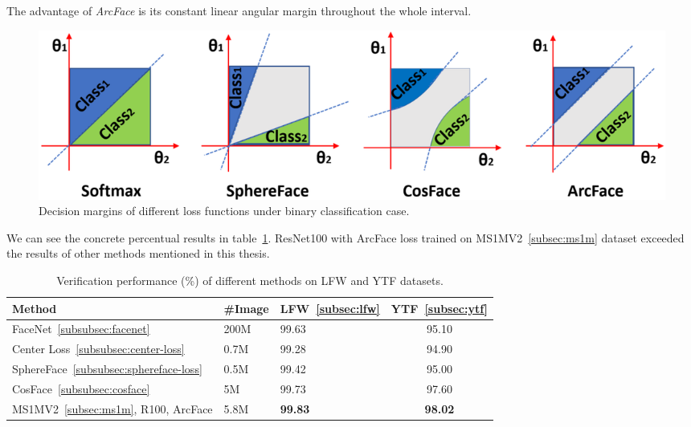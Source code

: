 The advantage of \textit{ArcFace} is its constant linear angular margin throughout the whole interval.

\begin{figure}[H]
    \centering
    \includegraphics[width=\columnwidth]{images/arcface/arcfacecomparison.png}
    \caption{Decision margins of different loss functions under binary classification case.~\cite{ArcFace}}
    \label{fig:arcfacecomp}
\end{figure}

We can see the concrete percentual results in table~\ref{tbl:arcfacecomp}.
ResNet100 with ArcFace loss trained on MS1MV2~\ref{subsec:ms1m} dataset exceeded the results of other methods mentioned
in this thesis.

\begin{table}[H]
    \begin{tabularx}{\textwidth}{l|XXc}
        Method                & \#Image & LFW~\ref{subsec:lfw}            & YTF~\ref{subsec:ytf}            \\ \hline
        FaceNet~\ref{subsubsec:facenet}               & 200M    & 99.63          & 95.10          \\
        Center Loss~\ref{subsubsec:center-loss}           & 0.7M    & 99.28          & 94.90          \\
        SphereFace~\ref{subsubsec:sphereface-loss}            & 0.5M    & 99.42          & 95.00          \\
        CosFace~\ref{subsubsec:cosface}               & 5M      & 99.73          & 97.60          \\
        MS1MV2~\ref{subsec:ms1m}, R100, ArcFace & 5.8M    & \textbf{99.83} & \textbf{98.02}
    \end{tabularx}
    \caption{Verification performance (\%) of different methods on LFW and YTF datasets.}
    \label{tbl:arcfacecomp}
\end{table}